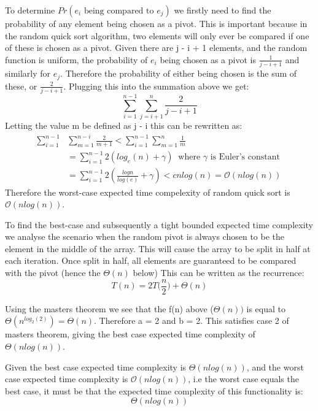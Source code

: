 \documentclass[11p]{article}
\begin{document}
To determine $Pr(e_i \text{ being compared to } e_j)$ we firstly need to find the probability of any element being chosen as a pivot. This is important because in the random quick sort algorithm, two elements will only ever be compared if one of these is chosen as a pivot. Given there are j - i + 1 elements, and the random function is uniform, the probability of $e_i$ being chosen as a pivot is $\frac{1}{j - i + 1}$ and similarly for $e_j$. Therefore the probability of either being chosen is the sum of these, or $\frac{2}{j-i+1}$. Plugging this into the summation above we get:
$$\sum_{i=1}^{n-1} \sum_{j = i+1}^{n} \frac{2}{j-i+1}$$
Letting the value m be defined as j - i this can be rewritten as:
\begin{align*}
    \sum_{i=1}^{n-1}& \sum_{m=1}^{n-i} \frac{2}{m+1} < \sum_{i=1}^{n-1} \sum_{m=1}^{n} \frac{1}{m} \\
    &=  \sum_{i=1}^{n-1} 2(log_e(n) + \gamma) \ \text{ where } \gamma \text{ is Euler's constant } \\
    & = \sum_{i=1}^{n-1} 2(\frac{logn}{log(e)} + \gamma) < cnlog(n) = \mathcal{O}(nlog(n))
\end{align*}
Therefore the worst-case expected time compelexity of random quick sort is $\mathcal{O}(nlog(n))$. \bigbreak

To find the best-case and subsequently a tight bounded expected time complexity we analyse the scenario when the random pivot is always chosen to be the element in the middle of the array. This will cause the array to be split in half at each iteration. Once split in half, all elements are guaranteed to be compared with the pivot (hence the $\Theta(n)$ below) This can be written as the recurrence:
$$T(n) = 2T\big( \frac{n}{2}\big) + \Theta(n)$$

Using the masters theorem we see that the f(n) above ($\Theta(n))$ is equal to $\Theta(n^{log_2(2)}) = \Theta(n)$. Therefore a = 2 and b = 2. This satisfies case 2 of masters theorem, giving the best case expected time complexity of $\Theta(nlog(n))$. \bigbreak

Given the best case expected time complexity is $\Theta(nlog(n))$, and the worst case expected time complexity is $\mathcal{O}(nlog(n))$, i.e the worst case equals the best case, it must be that the expected time complexity of this functionality is:
$$\Theta(nlog(n))$$
\end{document}
